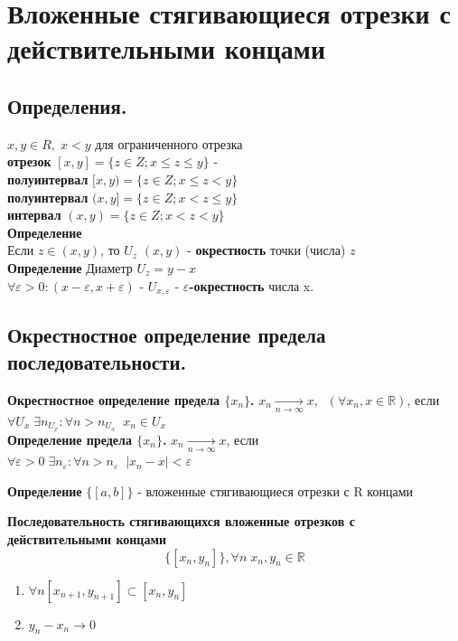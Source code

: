 \documentclass[12pt, a4paper]{article}
\newcommand{\R}{\mathbb{R}}
\newcommand{\eps}{\varepsilon}
\begin{document}
\section{Вложенные стягивающиеся отрезки с действительными концами}
\subsection{Определения.}
\begin{tcolorbox}
    $x,y \in R,\; x < y$ для ограниченного отрезка\\
    \textbf{отрезок} $[x, y] = \{z \in Z; x \leq z \leq y\}$ - \\
    \textbf{полуинтервал} $[x,y) = \{ z \in Z ; x\leq z < y \}$\\
    \textbf{полуинтервал} $(x,y] = \{ z \in Z ; x < z \leq y \}$\\
    \textbf{интервал} $(x,y) = \{ z \in Z; x < z < y \}$\\
    \textbf{Определение}\\
    Если $z \in (x, y)$, то $U_z$ $(x,y)$ - \textbf{окрестность} точки (числа) $z$\\
    \textbf{Определение}
    Диаметр $U_z = y-x$\\
    $\forall \eps > 0: (x-\eps,x+\eps)$ - $U_{x,\eps}$ - \textbf{$\eps$-окрестность} числа x.
\end{tcolorbox}

\subsection{Окрестностное определение предела последовательности.}
\begin{tcolorbox}
    \textbf{Окрестностное определение предела $\{x_n\}$.}
    $x_n \xrightarrow[n\rightarrow \infty]{} x,\;\; (\forall x_n, x\in\R)$, если\\
    $\forall U_x\; \exists n_{U_x}: \forall n > n_{U_x} \;\; x_n \in U_x $\\
    \textbf{Определение предела $\{x_n\}$.}
    $ x_n\xrightarrow[n\to\infty]{} x$, если\\
    $\forall \eps > 0\; \exists n_\eps: \forall n > n_\eps \;\; |x_n-x| < \eps$
\end{tcolorbox}

\begin{tcolorbox}
    \textbf{Определение}
    $\{[a, b]\}$ - вложенные стягивающиеся отрезки с R концами
\end{tcolorbox}

\begin{tcolorbox}
    \textbf{Последовательность стягивающихся вложенные отрезков с действительными концами}
    \[\{[x_n, y_n]\}, \forall n\;x_n,y_n \in \R\]
    \begin{enumerate}
        \item $\forall n [x_{n+1},y_{n+1}]\subset[x_n,y_n]$
        \item $y_n-x_n \to 0$
    \end{enumerate}  
\end{tcolorbox}
\end{document}
